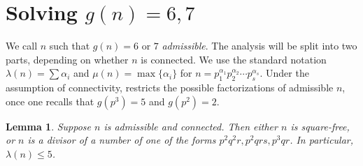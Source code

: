 \documentclass[a4paper, 12pt]{article}
\newcommand{\ufd}{p_1^{\alpha_1} p_2^{\alpha_2} \cdots p_s^{\alpha_s}}
\newcommand{\hthref}[1]{\hyperref[#1]{\thref{#1}}}
\theoremstyle{plain}
\newtheorem{lem}{Lemma}[section]
\theoremstyle{definition}
\begin{document}
\section{Solving $g(n) = 6, 7$}
We call $n$ such that $g(n) = 6\text{ or }7$ \emph{admissible}. The analysis will be split into two parts, depending on whether $n$ is connected. We use the standard notation $\lambda(n) = \sum \alpha_i$ and $\mu(n) = \max\{\alpha_i\}$ for $n = \ufd$. Under the assumption of connectivity, \hthref{euinout} restricts the possible factorizations of admissible $n$, once one recalls that $g(p^3) = 5$ and $g(p^2) = 2$.

\begin{lem}
	Suppose $n$ is admissible and connected. Then either $n$ is square-free, or $n$ is a divisor of a number of one of the forms $p^2 q^2 r, p^2 q r s, p^3 qr$. In particular, $\lambda(n) \le 5$.
\end{lem}
\end{document}
